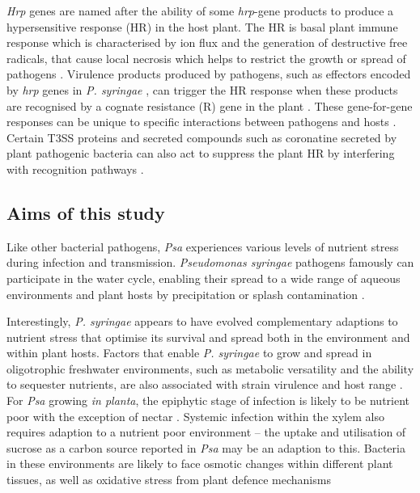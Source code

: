 \textit{Hrp} genes are named after the ability of some \textit{hrp}-gene products to produce a hypersensitive response (HR) in the host plant. The HR is basal plant immune response which is characterised by ion flux and the generation of destructive free radicals, that cause local necrosis which helps to restrict the growth or spread of pathogens \citep{He_1996}. Virulence products produced by pathogens, such as effectors encoded by \textit{hrp} genes in \textit{P. syringae} \citep{He1993-zp,He_1996}, can trigger the HR response when these products are recognised by a cognate resistance (R) gene in the plant \citep{Keen_1990x}. These gene-for-gene responses can be unique to specific interactions between pathogens and hosts \citep{Heath_2000x}. Certain T3SS proteins and secreted compounds such as coronatine secreted by plant pathogenic bacteria can also act to suppress the plant HR by interfering with recognition pathways \citep{Nomura2005-dn}.

\subsection{Aims of this study}

Like other bacterial pathogens, \textit{Psa} experiences various levels of nutrient stress during infection and transmission. \textit{Pseudomonas syringae} pathogens famously can participate in the water cycle, enabling their spread to a wide range of aqueous environments and plant hosts by precipitation or splash contamination \citep{Morris_Monteil_Berge_2013x,Morris2008-szx,Hirano1990-sc}. 

Interestingly, \textit{P. syringae} appears to have evolved complementary adaptions to nutrient stress that optimise its survival and spread both in the environment and within plant hosts. Factors that enable \textit{P. syringae} to grow and spread in oligotrophic freshwater environments, such as metabolic versatility and the ability to sequester nutrients, are also associated with strain virulence and host range \citep{Morris_Monteil_Berge_2013x}.
For \textit{Psa} growing \textit{in planta}, the epiphytic stage of infection is likely to be nutrient poor with the exception of nectar \citep{Donati2018-fe}. Systemic infection within the xylem also requires adaption to a nutrient poor environment \citep{Vinatzer2012-nr} -- the uptake and utilisation of sucrose as a carbon source reported in \textit{Psa} may be an adaption to this. Bacteria in these environments are likely to face osmotic changes within different plant tissues, as well as oxidative stress from plant defence mechanisms \citep{Jones_Lindow_Wildermuth_2007,Nomura2005-dn}

